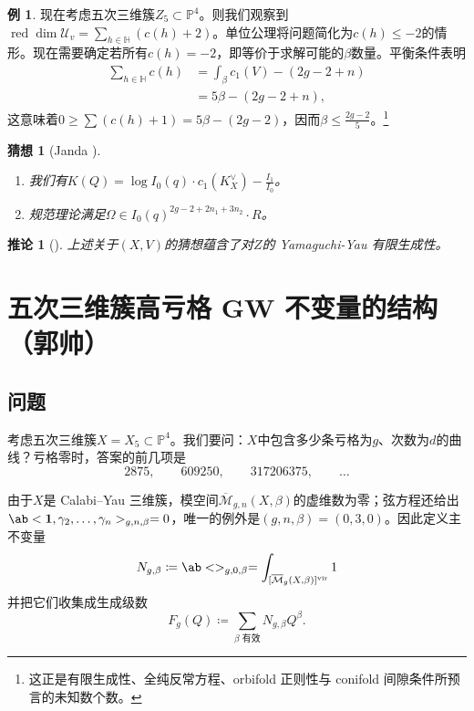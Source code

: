 \documentclass{amsart}
\newtheorem{cor}[thm]{推论}
\newtheorem{conj}[thm]{猜想}
\theoremstyle{definition}
\newtheorem{exm}[thm]{例}
\theoremstyle{remark}
\theoremstyle{plain}
\theoremstyle{definition}
\theoremstyle{remark}
\renewcommand{\H}{\mathbb{H}}
\renewcommand{\P}{\mathbb{P}}
\newcommand{\Mbar}{\overline{\mathcal{M}}}
\newcommand{\mc}[1]{\mathcal{#1}}
\newcommand{\mr}[1]{\mathrm{#1}}
\newcommand{\on}[1]{\operatorname{#1}}
\newcommand{\1}{\mathbf{1}}
\newcommand{\2}{\mathbf{2}}
\newcommand{\3}{\mathbf{3}}
\newcommand{\vir}{\mr{vir}}
\begin{document}
\begin{exm}
现在考虑五次三维簇\(Z_5 \subset \P^4\)。则我们观察到\(\on{red}\dim \mc{U}_v = \sum_{h \in \H} (c(h)+2)\)。单位公理将问题简化为\(c(h) \leq -2\)的情形。现在需要确定若所有\(c(h) = -2\)，即等价于求解可能的\(\beta\)数量。平衡条件表明
    \begin{align*}
        \sum_{h \in \H} c(h) &= \int_{\beta} c_1(V) - (2g-2+n) \\
        &= 5\beta - (2g-2+n),
    \end{align*}
    这意味着\(0 \geq \sum (c(h)+1) = 5\beta - (2g-2)\)，因而\(\beta \leq \frac{2g-2}{5}\)。\footnote{这正是有限生成性、全纯反常方程、orbifold 正则性与 conifold 间隙条件所预言的未知数个数。}
\end{exm}

\begin{conj}[Janda {\cite[猜想~1.6]{CJRtropical2025}}]\leavevmode
    \begin{enumerate}
        \item 我们有\(K(Q) = \log I_0(q) \cdot c_1(K_X^{\vee}) - \frac{I_1}{I_0}\)。\\
\item 规范理论满足\(\Omega \in I_0(q)^{2g-2+2n_1 + 3 n_2} \cdot R\)。
    \end{enumerate}
\end{conj}

\begin{cor}[{\cite[定理~1.7]{CJRtropical2025}}]
上述关于\((X, V)\)的猜想蕴含了对\(Z\)的 Yamaguchi-Yau 有限生成性。
\end{cor}

\section{五次三维簇高亏格 GW 不变量的结构（郭帅）}%
\label{sec:Structure of higher-genus GW invariants of the quintic (郭帅)}

\subsection{问题}%
\label{sub:The problem (Guo)}

考虑五次三维簇\(X = X_5 \subset \P^4\)。我们要问：\(X\)中包含多少条亏格为\(g\)、次数为\(d\)的曲线？亏格零时，答案的前几项是
\[ 2875, \qquad 609250, \qquad 317206375, \qquad \ldots \]

由于\(X\)是 Calabi--Yau 三维簇，模空间\(\Mbar_{g,n}(X,\beta)\)的虚维数为零；弦方程还给出\(\ab<\1, \gamma_2, \ldots, \gamma_n>_{g,n,\beta} = 0\)，唯一的例外是\((g,n,\beta) = (0,3,0)\)。因此定义主不变量
\[ N_{g,\beta} \coloneqq \ab<>_{g,0,\beta} = \int_{[\Mbar_g(X,\beta)]^{\vir}} 1 \]
并把它们收集成生成级数
\[ F_g(Q) \coloneqq \sum_{\beta \text{ 有效}} N_{g,\beta}Q^{\beta}. \]
\end{document}
